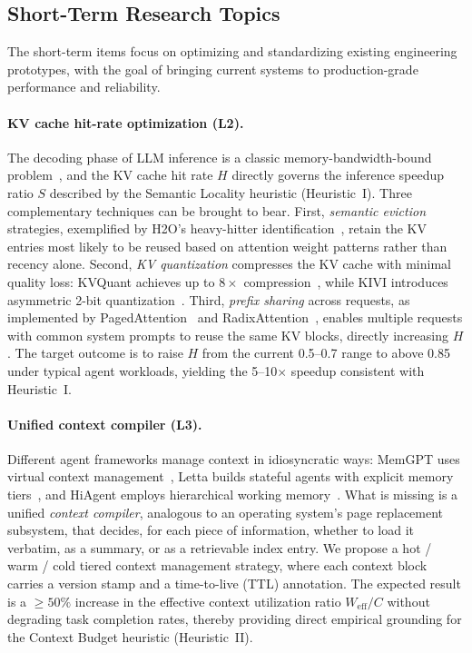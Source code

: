 

\subsection{Short-Term Research Topics}

The short-term items focus on optimizing and standardizing existing engineering prototypes, with the goal of bringing current systems to production-grade performance and reliability.

\paragraph{KV cache hit-rate optimization (L2).}
The decoding phase of LLM inference is a classic memory-bandwidth-bound problem~\cite{gholami2024memorywall}, and the KV cache hit rate $H$ directly governs the inference speedup ratio $S$ described by the Semantic Locality heuristic (Heuristic~I).
Three complementary techniques can be brought to bear.
First, \textit{semantic eviction} strategies, exemplified by H2O's heavy-hitter identification~\cite{h2o2023}, retain the KV entries most likely to be reused based on attention weight patterns rather than recency alone.
Second, \textit{KV quantization} compresses the KV cache with minimal quality loss: KVQuant achieves up to $8\times$ compression~\cite{hooper2024kvquant}, while KIVI introduces asymmetric 2-bit quantization~\cite{liu2024kivi}.
Third, \textit{prefix sharing} across requests, as implemented by PagedAttention~\cite{kwon2023pagedattention} and RadixAttention~\cite{sglang2024}, enables multiple requests with common system prompts to reuse the same KV blocks, directly increasing $H$.
The target outcome is to raise $H$ from the current 0.5--0.7 range to above 0.85 under typical agent workloads, yielding the 5--10$\times$ speedup consistent with Heuristic~I.

\paragraph{Unified context compiler (L3).}
Different agent frameworks manage context in idiosyncratic ways: MemGPT uses virtual context management~\cite{memgpt2023}, Letta builds stateful agents with explicit memory tiers~\cite{letta_stateful_2026}, and HiAgent employs hierarchical working memory~\cite{hiagent2024}.
What is missing is a unified \textit{context compiler}, analogous to an operating system's page replacement subsystem, that decides, for each piece of information, whether to load it verbatim, as a summary, or as a retrievable index entry.
We propose a hot / warm / cold tiered context management strategy, where each context block carries a version stamp and a time-to-live (TTL) annotation.
The expected result is a $\geq 50\%$ increase in the effective context utilization ratio $W_{\mathrm{eff}}/C$ without degrading task completion rates, thereby providing direct empirical grounding for the Context Budget heuristic (Heuristic~II).

